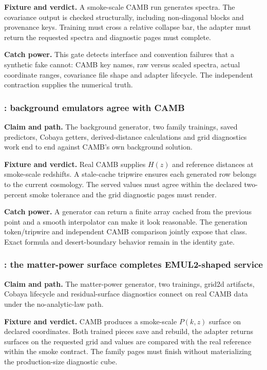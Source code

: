 \textbf{Fixture and verdict.}  A smoke-scale CAMB run generates spectra.  The
covariance output is checked structurally, including non-diagonal blocks and
provenance keys.  Training must cross a relative collapse bar, the adapter
must return the requested spectra and diagnostic pages must complete.

\textbf{Catch power.}  This gate detects interface and convention failures
that a synthetic fake cannot: CAMB key names, raw versus scaled spectra,
actual coordinate ranges, covariance file shape and adapter lifecycle.  The
independent  contraction supplies the numerical truth.

\subsubsection{: background emulators agree with CAMB}

\textbf{Claim and path.}  The background generator, two family trainings,
saved predictors, Cobaya getters, derived-distance calculations and grid
diagnostics work end to end against CAMB's own background solution.

\textbf{Fixture and verdict.}  Real CAMB supplies \(H(z)\) and reference
distances at smoke-scale redshifts.  A stale-cache tripwire ensures each
generated row belongs to the current cosmology.  The served values must agree
within the declared two-percent smoke tolerance and the grid diagnostic pages
must render.

\textbf{Catch power.}  A generator can return a finite array cached from the
previous point and a smooth interpolator can make it look reasonable.  The
generation token/tripwire and independent CAMB comparison jointly expose that
class.  Exact formula and desert-boundary behavior remain in the identity
gate.

\subsubsection{: the matter-power surface completes EMUL2-shaped service}

\textbf{Claim and path.}  The matter-power generator, two trainings,
grid2d artifacts, Cobaya  lifecycle and residual-surface
diagnostics connect on real CAMB data under the no-analytic-law path.

\textbf{Fixture and verdict.}  CAMB produces a smoke-scale
\(P(k,z)\) surface on declared coordinates.  Both trained pieces save and
rebuild, the adapter returns surfaces on the requested grid and values are
compared with the real reference within the smoke contract.  The family pages
must finish without materializing the production-size diagnostic cube.

